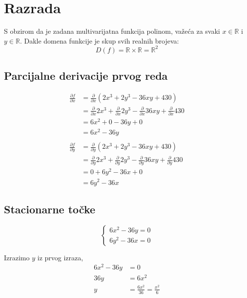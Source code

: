 \documentclass[12pt,a4paper]{report}
\begin{document}
\chapter{Razrada}

S obzirom da je zadana multivarijatna funkcija polinom, važeća za svaki $x \in \mathbb{R}$ i $y \in \mathbb{R}$.
Dakle domena funkcije je skup svih realnih brojeva:
$$
    D(f) = \mathbb{R} \times \mathbb{R} = \mathbb{R}^2
$$

\section{Parcijalne derivacije prvog reda}

\begin{align*}
    \frac{\partial f}{\partial x} & = \frac{\partial}{\partial x} (2x^3 + 2y^3 - 36xy + 430) \\
    & = \frac{\partial}{\partial x} 2x^3 + \frac{\partial}{\partial x}2y^3 - \frac{\partial}{\partial x}36xy + \frac{\partial}{\partial x}430 \\
    & = 6x^2 + 0 - 36y + 0 \\
    & = 6x^2 - 36y \\
    \\
    \frac{\partial f}{\partial y} & = \frac{\partial}{\partial y} (2x^3 + 2y^3 - 36xy + 430) \\
    & = \frac{\partial}{\partial y} 2x^3 + \frac{\partial}{\partial y}2y^3 - \frac{\partial}{\partial y}36xy + \frac{\partial}{\partial y}430 \\
    & = 0 + 6y^2 - 36x + 0\\
    & = 6y^2 - 36x
\end{align*}

\section{Stacionarne točke}

$$
\begin{cases}
    6x^2 - 36y = 0 \\
    6y^2 - 36x = 0
\end{cases}
$$

Izrazimo $y$ iz prvog izraza,
\begin{align*}
    6x^2 - 36y &= 0 \\
    36y & = 6x^2 \\
    y & = \frac{6x^2}{36} = \frac{x^2}{6} \\
\end{align*}
\end{document}

